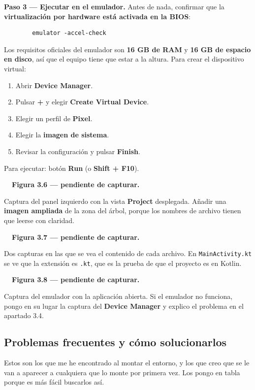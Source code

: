 \documentclass[11pt,a4paper]{article}
\newcommand{\archivo}[1]{\texttt{\color{accent!85!black}#1}}
\newcommand{\campo}[1]{\textbf{\color{primary}#1}}
\newcommand{\figpend}[2]{%
	\begin{capturabox}
		\textbf{\color{accent2!70!black}\faCamera\ \ Figura #1 --- pendiente de capturar.}%
		\par\smallskip #2
	\end{capturabox}%
}
\begin{document}
	\campo{Paso 3 --- Ejecutar en el emulador.}
	Antes de nada, confirmar que la \textbf{virtualización por hardware está activada en la BIOS}:
	\begin{verbatim}
		emulator -accel-check
	\end{verbatim}
	Los requisitos oficiales del emulador son \textbf{16 GB de RAM} y \textbf{16 GB de espacio en disco}, así que el equipo tiene que estar a la altura. Para crear el dispositivo virtual:
	\begin{enumerate}[leftmargin=*,itemsep=0.15em]
		\item Abrir \textbf{Device Manager}.
		\item Pulsar \textbf{+} y elegir \textbf{Create Virtual Device}.
		\item Elegir un perfil de \textbf{Pixel}.
		\item Elegir la \textbf{imagen de sistema}.
		\item Revisar la configuración y pulsar \textbf{Finish}.
	\end{enumerate}
	Para ejecutar: botón \textbf{Run} (o \textbf{Shift + F10}).
	
	\figpend{3.6}{Captura del panel izquierdo con la vista \textbf{Project} desplegada. Añadir una \textbf{imagen ampliada} de la zona del árbol, porque los nombres de archivo tienen que leerse con claridad.}
	
	\figpend{3.7}{Dos capturas en las que se vea el contenido de cada archivo. En \archivo{MainActivity.kt} se ve que la extensión es \archivo{.kt}, que es la prueba de que el proyecto es en Kotlin.}
	
	\figpend{3.8}{Captura del emulador con la aplicación abierta. Si el emulador no funciona, pongo en su lugar la captura del \textbf{Device Manager} y explico el problema en el apartado 3.4.}
	
	\subsection{Problemas frecuentes y cómo solucionarlos}
	
	Estos son los que me he encontrado al montar el entorno, y los que creo que se le van a aparecer a cualquiera que lo monte por primera vez. Los pongo en tabla porque es más fácil buscarlos así.
	
\end{document}

